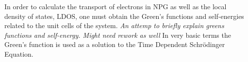 In order to calculate the transport of electrons in NPG as well as the local density of states, LDOS, one must obtain the Green's functions and self-energies related to the unit cells of the system. \textit{An attemp to briefly explain greens functions and self-energy. Might need rework as well} In very basic terms the Green's function is used as a solution to the Time Dependent Schr\"{o}dinger Equation. 
